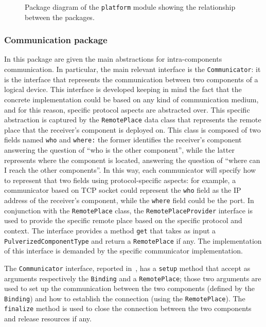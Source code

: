 \begin{figure}
	\centering
	\missingfigure{}
	\caption{Package diagram of the \texttt{platform} module showing the relationship between the packages.}
	\label{fig:platform-module}
\end{figure}

\subsubsection{Communication package}

In this package are given the main abstractions for intra-components communication. In particular, the main relevant interface is the
\texttt{Communicator}: it is the interface that represents the communication between two components of a logical device.
This interface is developed keeping in mind the fact that the concrete implementation could be based on any kind of communication medium,
and for this reason, specific protocol aspects are abstracted over. This specific abstraction is captured by the \texttt{RemotePlace} data class
that represents the remote place that the receiver's component is deployed on.
This class is composed of two fields named \texttt{who} and \texttt{where:} the former identifies the receiver's component answering the question of
``who is the other component'', while the latter represents where the component is located, answering the question of ``where can I reach the other
components''.
In this way, each communicator will specify how to represent that two fields using protocol-specific aspects: for example, a communicator based on
TCP socket could represent the \texttt{who} field as the IP address of the receiver's component, while the \texttt{where} field could be the port.
In conjunction with the \texttt{RemotePlace} class, the \texttt{RemotePlaceProvider} interface is used to provide the specific remote place based
on the specific protocol and context. The interface provides a method \texttt{get} that takes as input a \texttt{PulverizedComponentType} and
return a \texttt{RemotePlace} if any. The implementation of this interface is demanded by the specific communicator implementation.

The \texttt{Communicator} interface, reported in~, has a \texttt{setup} method that accept as arguments respectively
the \texttt{Binding} and a \texttt{RemotePlace};
those two arguments are used to set up the communication between the two components (defined by the \texttt{Binding}) and how to establish
the connection (using the \texttt{RemotePlace}). The \texttt{finalize} method is used to close the connection between the two components and release
resources if any.

